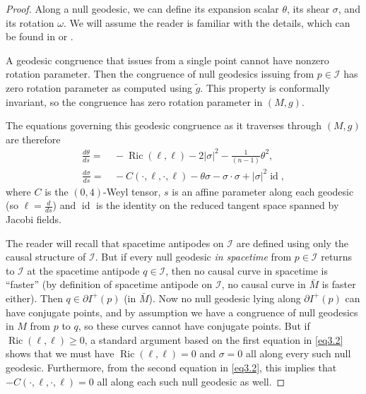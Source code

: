 \documentclass[12pt]{amsart}
\numberwithin{equation}{section}
\DeclareMathOperator{\ric}{Ric}
\DeclareMathOperator{\id}{id}
\begin{document}
\begin{proof}
Along a null geodesic, we can define its expansion scalar $\theta$, its shear $\sigma$, and its rotation $\omega$. We will assume the reader is familiar with the details, which can be found in \cite[Chapter 4]{HE} or \cite[Chapter 12]{BEE}.

A geodesic congruence that issues from a single point cannot have nonzero rotation parameter. Then the congruence of null geodesics issuing from $p\in {\mathcal I}$ has zero rotation parameter as computed using ${\tilde g}$. This property is conformally invariant, so the congruence has zero rotation parameter in $(M,g)$.

The equations governing this geodesic congruence as it traverses through $(M,g)$ are therefore
\begin{equation}
\label{eq3.2}
\begin{split}
\frac{d\theta}{ds}=&\, -\ric(\ell,\ell)-2|\sigma|^2-\frac{1}{(n-1)}\theta^2,\\
\frac{d\sigma}{ds}=&\, -C(\cdot,\ell,\cdot,\ell) -\theta\sigma-\sigma\cdot\sigma+|\sigma|^2\id,
\end{split}
\end{equation}
where $C$ is the $(0,4)$-Weyl tensor, $s$ is an affine parameter along each geodesic (so $\ell=\frac{d}{ds}$) and $\id$ is the identity on the reduced tangent space spanned by Jacobi fields.

The reader will recall that spacetime antipodes on ${\mathcal I}$ are defined using only the causal structure of ${\mathcal I}$. But if every null geodesic \emph{in spacetime} from $p\in {\mathcal I}$ returns to ${\mathcal I}$ at the spacetime antipode $q\in {\mathcal I}$, then no causal curve in spacetime is ``faster'' (by definition of spacetime antipode on ${\mathcal I}$, no causal curve in ${\bar M}$ is faster either). Then $q\in \partial I^+(p)$ (in ${\bar M}$). Now no null geodesic lying along $ \partial I^+(p)$ can have conjugate points, and by assumption we have a congruence of null geodesics in $M$ from $p$ to $q$, so these curves cannot have conjugate points. But if $\ric(\ell,\ell)\ge 0$, a standard argument based on the first equation in \eqref{eq3.2} shows that we must have $\ric(\ell,\ell)=0$ and $\sigma=0$ all along every such null geodesic. Furthermore, from the second equation in \eqref{eq3.2}, this implies that $-C(\cdot,\ell,\cdot,\ell)=0$ all along each such null geodesic as well.


\end{proof}
\end{document}
